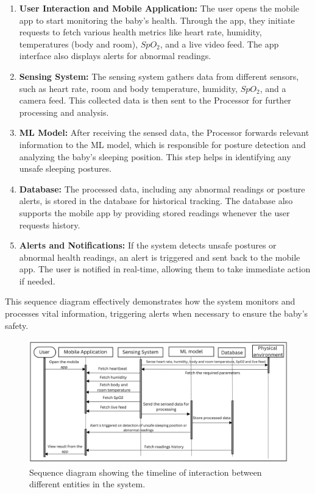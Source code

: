 \documentclass[12pt,a4paper]{report}
\begin{document}
\begin{enumerate}
  \item \textbf{User Interaction and Mobile Application:} The user opens the mobile app to start monitoring the baby’s health. Through the app, they initiate requests to fetch various health metrics like heart rate, humidity, temperatures (body and room), $SpO_2$, and a live video feed. The app interface also displays alerts for abnormal readings.
  \item \textbf{Sensing System:} The sensing system gathers data from different sensors, such as heart rate, room and body temperature, humidity, $SpO_2$, and a camera feed. This collected data is then sent to the Processor for further processing and analysis.
  \item \textbf{ML Model:} After receiving the sensed data, the Processor forwards relevant information to the ML model, which is responsible for posture detection and analyzing the baby’s sleeping position. This step helps in identifying any unsafe sleeping postures.
  \item \textbf{Database:} The processed data, including any abnormal readings or posture alerts, is stored in the database for historical tracking. The database also supports the mobile app by providing stored readings whenever the user requests history.
  \item \textbf{Alerts and Notifications:} If the system detects unsafe postures or abnormal health readings, an alert is triggered and sent back to the mobile app. The user is notified in real-time, allowing them to take immediate action if needed.
\end{enumerate}
This sequence diagram effectively demonstrates how the system monitors and processes vital information, triggering alerts when necessary to ensure the baby’s safety. 
\begin{figure}[hbtp]
  \centering
  \includegraphics[scale=0.285]{./pic/seq.png}
  \caption{Sequence diagram showing the timeline of interaction between different entities in the system.}
  \label{fig:sequence}
\end{figure}
\end{document}
